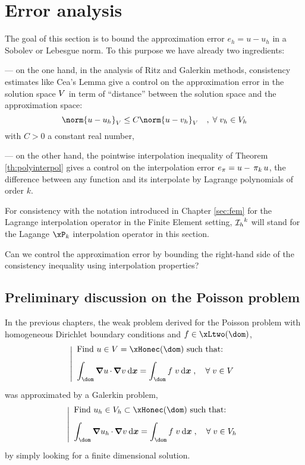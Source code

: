
\chapter{Error analysis}\label{sec:error_analysis}

The goal of this section is to bound the approximation error $e_h = u - u_h$ in a Sobolev or Lebesgue norm.
To this purpose we have already two ingredients:

--- on the one hand, in the analysis of Ritz and Galerkin methods, consistency estimates like Cea's Lemma give a control on the approximation error in the solution space ${V}$ in term of ``distance'' between the solution space and the approximation space:
\begin{equation*}
\norm{u - u_h}_\xV  \leq C \norm{u - v_h}_\xV\quad,\; \forany v_h \in \xVh
\end{equation*}
with $C > 0$ a constant real number,

--- on the other hand, the pointwise interpolation inequality of Theorem \eqref{th:polyinterpol} gives a control on the interpolation error $e_{\pi} = u - \,\mathrm{\pi}_{k}\, u$, \ie the difference between any function and its interpolate by Lagrange polynomials of order $k$.

\medskip
For consistency with the notation introduced in Chapter \ref{sec:fem} for the Lagrange interpolation operator in the Finite Element setting, $\mathop{\mathcal{I}_{h}}^k$ will stand for the Lagange $\xP_k$ interpolation operator in this section.

\medskip
\Question Can we control the approximation error by bounding the right-hand side of the consistency inequality using interpolation properties?

\section{Preliminary discussion on the Poisson problem}

In the previous chapters, the weak problem derived for the Poisson problem with homogeneous Dirichlet boundary conditions and $f\in\xLtwo(\dom)$,
\begin{equation*}
\left\lvert
\begin{array}{ll}
\mbox{Find $u\in \xV = \xHonec(\dom)$ such that:}\\[2ex]
\displaystyle\int_\dom \Grad{u}\xDot\Grad{v} \dx = \int_\dom f\;v \dx\;,\quad\forany v \in\xV\\[2ex]
\end{array}
\right.
\end{equation*}
was approximated by a Galerkin problem,
\begin{equation*}
\left\lvert
\begin{array}{ll}
\mbox{Find $u_h\in\xVh\subset\xHonec(\dom)$ such that:}\\[2ex]
\displaystyle\int_\dom \Grad{u_h}\xDot\Grad{v} \dx = \int_\dom f\;v \dx\;,\quad\forany v \in\xVh\\[2ex]
\end{array}
\right.
\end{equation*}
by simply looking for a finite dimensional solution.

